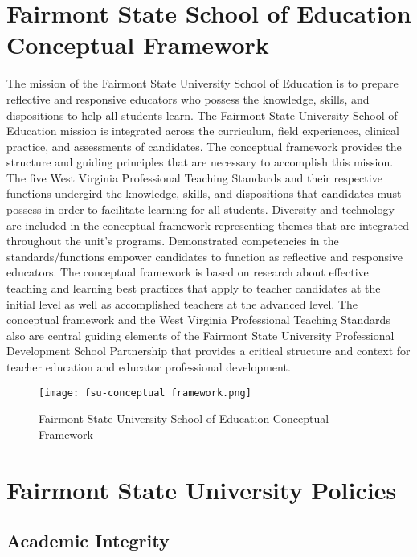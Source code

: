 \section{Fairmont State School of Education Conceptual Framework}
The mission of the Fairmont State University School of Education is to prepare reflective and responsive educators who possess the knowledge, skills, and dispositions to help all students learn. The Fairmont State University School of Education mission is integrated across the curriculum, field experiences, clinical practice, and assessments of candidates. The conceptual framework provides the structure and guiding principles that are necessary to accomplish this mission. The five West Virginia Professional Teaching Standards and their respective functions undergird the knowledge, skills, and dispositions that candidates must possess in order to facilitate learning for all students. Diversity and technology are included in the conceptual framework representing themes that are integrated throughout the unit's programs. Demonstrated competencies in the standards/functions empower candidates to function as reflective and responsive educators. The conceptual framework is based on research about effective teaching and learning best practices that apply to teacher candidates at the initial level as well as accomplished teachers at the advanced level. The conceptual framework and the West Virginia Professional Teaching Standards also are central guiding elements of the Fairmont State University Professional Development School Partnership that provides a critical structure and context for teacher education and educator professional development.

\begin{center}
\begin{figure}%
  \centerline{\texttt{[image: fsu-conceptual framework.png]}}
  \caption{Fairmont State University School of Education Conceptual Framework}
  \label{fig:fsu-cf}
\end{figure}
\end{center}

\section{Fairmont State University Policies}

\subsection{Academic Integrity}


